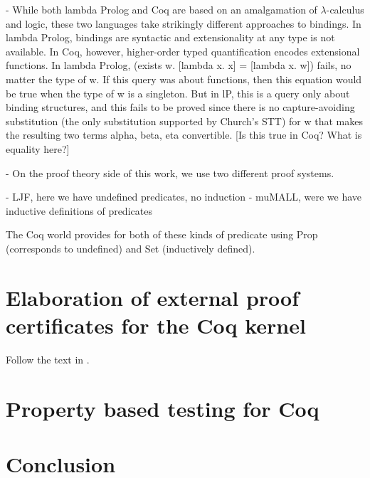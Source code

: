 \documentclass[a4paper,USenglish,cleveref, autoref, thm-restate]{lipics-v2019}
\begin{document}
  - While both lambda Prolog and Coq are based on an amalgamation of
    $\lambda$-calculus and logic, these two languages take strikingly
    different approaches to bindings.  In lambda Prolog, bindings are
    syntactic and extensionality at any type is not available.  In
    Coq, however, higher-order typed quantification encodes
    extensional functions.  In lambda Prolog, (exists w. [lambda x. x]
    = [lambda x. w]) fails, no matter the type of w.  If this query
    was about functions, then this equation would be true when the
    type of w is a singleton.  But in lP, this is a query only about
    binding structures, and this fails to be proved since there is no
    capture-avoiding substitution (the only substitution supported by
    Church's STT) for w that makes the resulting two terms alpha,
    beta, eta convertible.  [Is this true in Coq?  What is equality
    here?]

  - On the proof theory side of this work, we use two different proof
    systems.

    - LJF, here we have undefined predicates, no induction
    - muMALL, were we have inductive definitions of predicates

    The Coq world provides for both of these kinds of predicate using
    Prop (corresponds to undefined) and Set (inductively defined).


\section{Elaboration of external proof certificates for the Coq
  kernel}

Follow the text in \cite{blanco20coq}.

\section{Property based testing for Coq}

\section{Conclusion}


 
\end{document}
